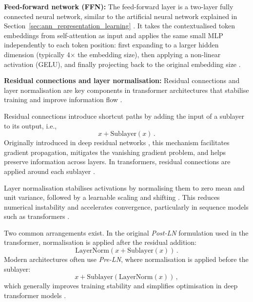 \textbf{Feed-forward network (FFN):} The feed-forward layer is a two-layer fully connected neural network, similar to the artificial neural network explained in Section~\ref{sec:ann_representation_learning} \citep{VaswaniTransformerBase}. It takes the contextualised token embeddings from self-attention as input and applies the same small MLP independently to each token position: first expanding to a larger hidden dimension (typically 4× the embedding size), then applying a non-linear activation (GELU), and finally projecting back to the original embedding size \citep{tunstall2022naturaltransformer}.

\textbf{Residual connections and layer normalisation:}
Residual connections and layer normalisation are key components in transformer architectures that stabilise training and improve information flow \citep{VaswaniTransformerBase, ba2016layernormalization, he2015deepresiduallearningimage}.

Residual connections introduce shortcut paths by adding the input of a sublayer to its output, i.e.,
\begin{equation*}
x + \mathrm{Sublayer}(x) \, .
\end{equation*}
Originally introduced in deep residual networks \citep{he2015deepresiduallearningimage}, this mechanism facilitates gradient propagation, mitigates the vanishing gradient problem, and helps preserve information across layers. In transformers, residual connections are applied around each sublayer \citep{VaswaniTransformerBase}.

Layer normalisation stabilises activations by normalising them to zero mean and unit variance, followed by a learnable scaling and shifting \citep{ba2016layernormalization}. This reduces numerical instability and accelerates convergence, particularly in sequence models such as transformers \citep{VaswaniTransformerBase}.

Two common arrangements exist. In the original \emph{Post-LN} formulation used in the transformer, normalisation is applied after the residual addition:
\begin{equation*}
\mathrm{LayerNorm}(x + \mathrm{Sublayer}(x)) \, .
\end{equation*}
Modern architectures often use \emph{Pre-LN}, where normalisation is applied before the sublayer:
\begin{equation*}
x + \mathrm{Sublayer}(\mathrm{LayerNorm}(x)) \, ,
\end{equation*}
which generally improves training stability and simplifies optimisation in deep transformer models \citep{ba2016layernormalization}.

